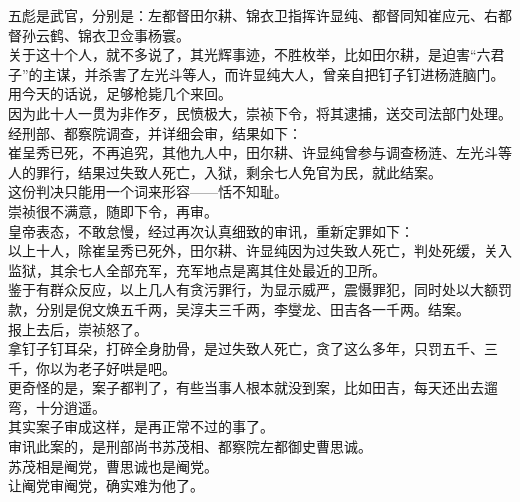 \begin{multicols}{\theparacolNo}
五彪是武官，分别是：左都督田尔耕、锦衣卫指挥许显纯、都督同知崔应元、右都督孙云鹤、锦衣卫佥事杨寰。\\

关于这十个人，就不多说了，其光辉事迹，不胜枚举，比如田尔耕，是迫害“六君子”的主谋，并杀害了左光斗等人，而许显纯大人，曾亲自把钉子钉进杨涟脑门。用今天的话说，足够枪毙几个来回。\\

因为此十人一贯为非作歹，民愤极大，崇祯下令，将其逮捕，送交司法部门处理。\\

经刑部、都察院调查，并详细会审，结果如下：\\

崔呈秀已死，不再追究，其他九人中，田尔耕、许显纯曾参与调查杨涟、左光斗等人的罪行，结果过失致人死亡，入狱，剩余七人免官为民，就此结案。\\

这份判决只能用一个词来形容——恬不知耻。\\

崇祯很不满意，随即下令，再审。\\

皇帝表态，不敢怠慢，经过再次认真细致的审讯，重新定罪如下：\\

以上十人，除崔呈秀已死外，田尔耕、许显纯因为过失致人死亡，判处死缓，关入监狱，其余七人全部充军，充军地点是离其住处最近的卫所。\\

鉴于有群众反应，以上几人有贪污罪行，为显示威严，震慑罪犯，同时处以大额罚款，分别是倪文焕五千两，吴淳夫三千两，李燮龙、田吉各一千两。结案。\\

报上去后，崇祯怒了。\\

拿钉子钉耳朵，打碎全身肋骨，是过失致人死亡，贪了这么多年，只罚五千、三千，你以为老子好哄是吧。\\

更奇怪的是，案子都判了，有些当事人根本就没到案，比如田吉，每天还出去遛弯，十分逍遥。\\

其实案子审成这样，是再正常不过的事了。\\

审讯此案的，是刑部尚书苏茂相、都察院左都御史曹思诚。\\

苏茂相是阉党，曹思诚也是阉党。\\

让阉党审阉党，确实难为他了。\\


\end{multicols}
